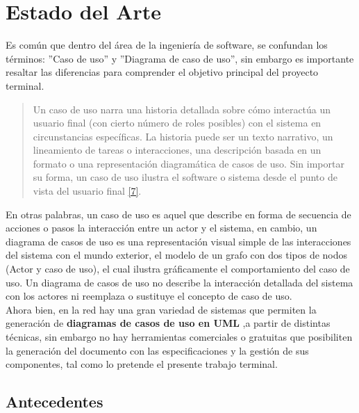 \chapter{Estado del Arte} \label{cap:tres}

	Es común que dentro del área de la ingeniería de software, se confundan los términos: ''Caso de uso'' y ''Diagrama de caso de uso'', sin embargo es importante resaltar las diferencias para comprender el objetivo principal del proyecto terminal.
	
	\begin{quote}
		\small Un caso de uso narra una historia detallada sobre cómo interactúa un usuario final (con cierto número de roles posibles) con el sistema en circunstancias específicas. La historia puede ser un texto narrativo, un lineamiento de tareas o interacciones, una descripción basada en un formato o una representación diagramática de casos de uso. Sin importar su forma, un caso de uso ilustra el software o sistema desde el punto de vista del usuario final \hyperlink{b07}{[7]}. 
	\end{quote}
	 	
	En otras palabras, un caso de uso es aquel que describe en forma de secuencia de acciones o pasos la interacción entre un actor y el sistema, en cambio, un diagrama de casos de uso es una representación visual simple de las interacciones del sistema con el mundo exterior, el modelo de un grafo con dos tipos de nodos (Actor y caso de uso), el cual ilustra gráficamente el comportamiento del caso de uso. Un diagrama de casos de uso no describe la interacción detallada del sistema con los actores ni reemplaza o sustituye el concepto de caso de uso.\\
	
	Ahora bien, en la red hay una gran variedad de sistemas que permiten la generación de \textbf {diagramas de casos de uso en UML} ,a partir de distintas técnicas, sin embargo no hay herramientas comerciales o gratuitas que posibiliten la generación del documento con las especificaciones y la gestión de sus componentes, tal como lo pretende el presente trabajo terminal.
	
    \newpage
\section{Antecedentes}

